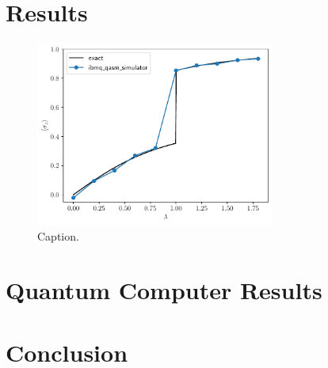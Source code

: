 \documentclass[12pt]{article}
\begin{document}
  \section{Results}

    \begin{figure}
      \centering
      \includegraphics[width=0.7\textwidth]{images/ground-state-magnetization-test}
      \caption{Caption.%
              \label{fig:ground-state-magnetization}}
    \end{figure}

  \section{Quantum Computer Results}
  \blindtext

  \section{Conclusion}
  \blindtext
\end{document}
